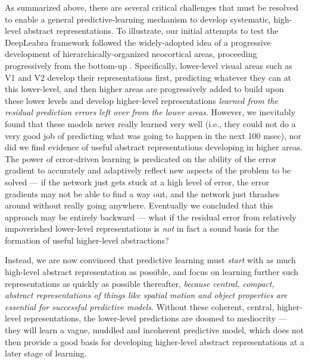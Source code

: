 \documentclass[11pt,twoside]{article}
\newif\myifpdf
\begin{document}
As summarized above, there are several critical challenges that must be resolved to enable a general predictive-learning mechanism to develop systematic, high-level abstract representations.  To illustrate, our initial attempts to test the DeepLeabra framework followed the widely-adopted idea of a progressive development of hierarchically-organized neocortical areas, proceeding progressively from the bottom-up \cite{ShragerJohnson96,BengioYaoAlainEtAl13,Valpola14,RasmusBerglundHonkalaEtAl15,HintonSalakhutdinov06}.  Specifically, lower-level visual areas such as V1 and V2 develop their representations first, predicting whatever they can at this lower-level, and then higher areas are progressively added to build upon these lower levels and develop higher-level representations {\em learned from the residual prediction errors left over from the lower areas}.  However, we inevitably found that these models never really learned very well (i.e., they could not do a very good job of predicting what was going to happen in the next 100 msec), nor did we find evidence of useful abstract representations developing in higher areas.  The power of error-driven learning is predicated on the ability of the error gradient to accurately and adaptively reflect new aspects of the problem to be solved --- if the network just gets stuck at a high level of error, the error gradients may not be able to find a way out, and the network just thrashes around without really going anywhere.   Eventually we concluded that this approach may be entirely backward --- what if the residual error from relatively impoverished lower-level representations is {\em not} in fact a sound basis for the formation of useful higher-level abstractions?

Instead, we are now convinced that predictive learning must {\em start} with as much high-level abstract representation as possible, and focus on learning further such representations as quickly as possible thereafter, {\em because central, compact, abstract representations of things like spatial motion and object properties are essential for successful predictive models}.  Without these coherent, central, higher-level representations, the lower-level predictions are doomed to mediocrity --- they will learn a vague, muddled and incoherent predictive model, which does not then provide a good basis for developing higher-level abstract representations at a later stage of learning.
\end{document}
